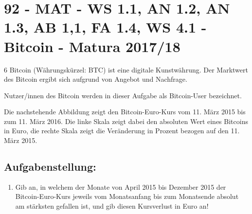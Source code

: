 \section{92 - MAT - WS 1.1, AN 1.2, AN 1.3, AB 1,1, FA 1.4, WS 4.1  - Bitcoin - Matura 2017/18}

\begin{langesbeispiel} \item[6] %
			Bitcoin (Währungskürzel: BTC) ist eine digitale Kunstwährung. Der Marktwert des Bitcoin ergibt sich aufgrund von Angebot und Nachfrage.
			
Nutzer/innen des Bitcoin werden in dieser Aufgabe als Bitcoin-User bezeichnet.

Die nachstehende Abbildung zeigt den Bitcoin-Euro-Kurs vom 11. März 2015 bis zum 11. März 2016. Die linke Skala zeigt dabei den absoluten Wert eines Bitcoins in Euro, die rechte Skala zeigt die Veränderung in Prozent bezogen auf den 11. März 2015.

\begin{center}
\end{center}

\subsection{Aufgabenstellung:}
\begin{enumerate}
	\item Gib an, in welchem der Monate von April 2015 bis Dezember 2015 der Bitcoin-Euro-Kurs jeweils vom Monatsanfang bis zum Monatsende absolut am stärksten gefallen ist, und gib diesen Kursverlust in Euro an!\leer
	

\end{enumerate}
\end{langesbeispiel}
